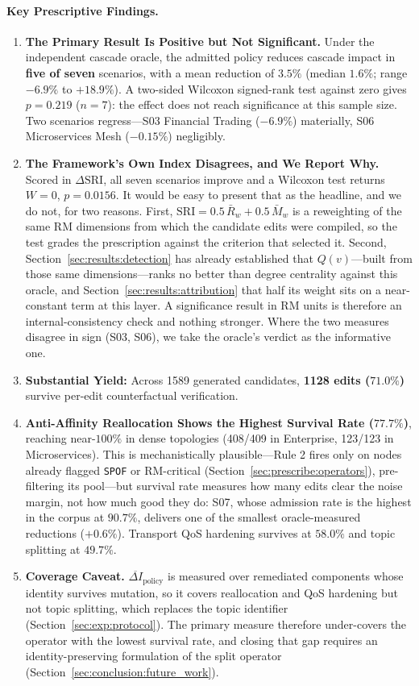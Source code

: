 \paragraph{Key Prescriptive Findings.}
\begin{enumerate}
    \item \textbf{The Primary Result Is Positive but Not Significant.} Under the independent cascade oracle, the admitted policy reduces cascade impact in \textbf{five of seven} scenarios, with a mean reduction of $3.5\%$ (median $1.6\%$; range $-6.9\%$ to $+18.9\%$). A two-sided Wilcoxon signed-rank test against zero gives $p = 0.219$ ($n=7$): the effect does not reach significance at this sample size. Two scenarios regress---S03 Financial Trading ($-6.9\%$) materially, S06 Microservices Mesh ($-0.15\%$) negligibly.
    \item \textbf{The Framework's Own Index Disagrees, and We Report Why.} Scored in $\Delta\mathrm{SRI}$, all seven scenarios improve and a Wilcoxon test returns $W=0$, $p=0.0156$. It would be easy to present that as the headline, and we do not, for two reasons. First, $\mathrm{SRI} = 0.5\,\bar{R}_w + 0.5\,\bar{M}_w$ is a reweighting of the same RM dimensions from which the candidate edits were compiled, so the test grades the prescription against the criterion that selected it. Second, Section~\ref{sec:results:detection} has already established that $Q(v)$---built from those same dimensions---ranks no better than degree centrality against this oracle, and Section~\ref{sec:results:attribution} that half its weight sits on a near-constant term at this layer. A significance result in RM units is therefore an internal-consistency check and nothing stronger. Where the two measures disagree in sign (S03, S06), we take the oracle's verdict as the informative one.
    \item \textbf{Substantial Yield:} Across 1589 generated candidates, \textbf{1128 edits ($71.0\%$)} survive per-edit counterfactual verification.
    \item \textbf{Anti-Affinity Reallocation Shows the Highest Survival Rate ($77.7\%$)}, reaching near-$100\%$ in dense topologies (408/409 in Enterprise, 123/123 in Microservices). This is mechanistically plausible---Rule 2 fires only on nodes already flagged \texttt{SPOF} or RM-critical (Section~\ref{sec:prescribe:operators}), pre-filtering its pool---but survival rate measures how many edits clear the noise margin, not how much good they do: S07, whose admission rate is the highest in the corpus at $90.7\%$, delivers one of the smallest oracle-measured reductions ($+0.6\%$). Transport QoS hardening survives at $58.0\%$ and topic splitting at $49.7\%$.
    \item \textbf{Coverage Caveat.} $\overline{\Delta I}_{\text{policy}}$ is measured over remediated components whose identity survives mutation, so it covers reallocation and QoS hardening but not topic splitting, which replaces the topic identifier (Section~\ref{sec:exp:protocol}). The primary measure therefore under-covers the operator with the lowest survival rate, and closing that gap requires an identity-preserving formulation of the split operator (Section~\ref{sec:conclusion:future_work}).
\end{enumerate}

